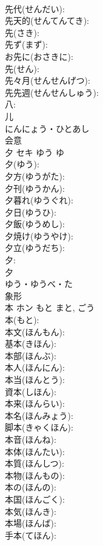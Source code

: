 \documentclass[8pt]{extreport}
\begin{document}
\begin{CJK}{UTF8}{min}
\\	先代(せんだい): 
\\	先天的(せんてんてき): 
\\	先(さき): 
\\	先ず(まず): 
\\	お先に(おさきに): 
\\	先(せん): 
\\	先々月(せんせんげつ): 
\\	先先週(せんせんしゅう): 
\\	八: 
\\	儿	
\\	にんにょう・ひとあし	
\\	会意 
\\	夕	セキ	ゆう	ゆ	
\\	夕(ゆう): 
\\	夕方(ゆうがた): 
\\	夕刊(ゆうかん): 
\\	夕暮れ(ゆうぐれ): 
\\	夕日(ゆうひ): 
\\	夕飯(ゆうめし): 
\\	夕焼け(ゆうやけ): 
\\	夕立(ゆうだち): 
\\	夕: 
\\	夕	
\\	ゆう・ゆうべ・た	
\\	象形 
\\	本	ホン	もと	まと, ごう	
\\	本(もと): 
\\	本文(ほんもん): 
\\	基本(きほん): 
\\	本部(ほんぶ): 
\\	本人(ほんにん): 
\\	本当(ほんとう): 
\\	資本(しほん): 
\\	本来(ほんらい): 
\\	本名(ほんみょう): 
\\	脚本(きゃくほん): 
\\	本音(ほんね): 
\\	本体(ほんたい): 
\\	本質(ほんしつ): 
\\	本物(ほんもの): 
\\	本の(ほんの): 
\\	本国(ほんごく): 
\\	本気(ほんき): 
\\	本場(ほんば): 
\\	手本(てほん): 

\end{CJK}
\end{document}
